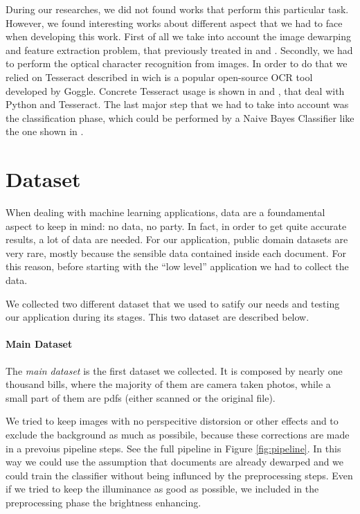 \documentclass[10pt,twocolumn,letterpaper]{article}
\begin{document}
During our researches, we did not found works that perform this
particular task. However, we found interesting works about different
aspect that we had to face when developing this work.  First of all we
take into account the image dewarping and feature extraction problem,
that previously treated in \cite{Korber18} and \cite{AbbasHussain17}.
Secondly, we had to perform the optical character recognition from
images. In order to do that we relied on Tesseract described in
\cite{Smith07} wich is a popular open-source OCR tool developed by
Goggle. Concrete Tesseract usage is shown in \cite{Benabderrazak20}
and \cite{ZelicSable20}, that deal with Python and Tesseract. The
last major step that we had to take into account was the
classification phase, which could be performed by a Naive Bayes
Classifier like the one shown in \cite{ScikitTextDataTutorial}.

\section{Dataset}
\label{sec:dataset}

When dealing with machine learning applications, data are a
foundamental aspect to keep in mind: no data, no party. In fact, in
order to get quite accurate results, a lot of data are needed. For our
application, public domain datasets are very rare, mostly because the
sensible data contained inside each document. For this reason, before
starting with the ``low level'' application we had to collect the
data.

We collected two different dataset that we used to satify our needs
and testing our application during its stages. This two dataset are
described below.

\paragraph{Main Dataset}
\label{par:main-dataset}

The \emph{main dataset} is the first dataset we collected. It is
composed by nearly one thousand bills, where the majority of them are
camera taken photos, while a small part of them are pdfs (either
scanned or the original file).

We tried to keep images with no perspecitive distorsion or other
effects and to exclude the background as much as possibile, because
these corrections are made in a prevoius pipeline steps. See the full
pipeline in Figure \ref{fig:pipeline}.  In this way we could use the
assumption that documents are already dewarped and we could train the
classifier without being influnced by the preprocessing steps. Even if
we tried to keep the illuminance as good as possible, we included in
the preprocessing phase the brightness enhancing.
\end{document}
